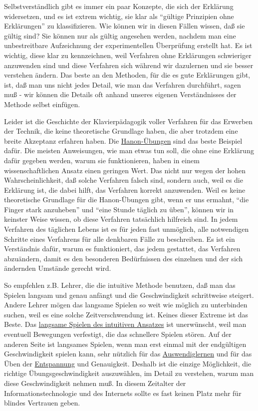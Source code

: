 Selbstverständlich gibt es immer ein paar Konzepte, die sich der Erklärung widersetzen, und es ist extrem wichtig, sie klar als \enquote{gültige Prinzipien ohne Erklärungen} zu klassifizieren.
 Wie können wir in diesen Fällen wissen, daß sie gültig sind?
 Sie können nur als gültig angesehen werden, nachdem man eine unbestreitbare Aufzeichnung der experimentellen Überprüfung erstellt hat.
 Es ist wichtig, diese klar zu kennzeichnen, weil Verfahren ohne Erklärungen schwieriger anzuwenden sind und diese Verfahren sich während wir dazulernen und sie besser verstehen ändern.
 Das beste an den Methoden, für die es gute Erklärungen gibt, ist, daß man uns nicht jedes Detail, wie man das Verfahren durchführt, sagen muß - wir können die Details oft anhand unseres eigenen Verständnisses der Methode selbst einfügen.
 

Leider ist die Geschichte der Klavierpädagogik voller Verfahren für das Erwerben der Technik, die keine theoretische Grundlage haben, die aber trotzdem eine breite Akzeptanz erfahren haben.
 Die \hyperlink{c1iii7h}{Hanon-Übungen} sind das beste Beispiel dafür.
 Die meisten Anweisungen, wie man etwas tun soll, die ohne eine Erklärung dafür gegeben werden, warum sie funktionieren, haben in einem wissenschaftlichen Ansatz einen geringen Wert.
 Das nicht nur wegen der hohen Wahrscheinlichkeit, daß solche Verfahren falsch sind, sondern auch, weil es die Erklärung ist, die dabei hilft, das Verfahren korrekt anzuwenden.
 Weil es keine theoretische Grundlage für die Hanon-Übungen gibt, wenn er uns ermahnt, \enquote{die Finger stark anzuheben} und \enquote{eine Stunde täglich zu üben}, können wir in keinster Weise wissen, ob diese Verfahren tatsächlich hilfreich sind.
 In jedem Verfahren des täglichen Lebens ist es für jeden fast unmöglich, alle notwendigen Schritte eines Verfahrens für alle denkbaren Fälle zu beschreiben.
 Es ist ein Verständnis dafür, warum es funktioniert, das jedem gestattet, das Verfahren abzuändern, damit es den besonderen Bedürfnissen des einzelnen und der sich ändernden Umstände gerecht wird.
 

So empfehlen z.B. Lehrer, die die intuitive Methode benutzen, daß man das Spielen langsam und genau anfängt und die Geschwindigkeit schrittweise steigert.
 Andere Lehrer mögen das langsame Spielen so weit wie möglich zu unterbinden suchen, weil es eine solche Zeitverschwendung ist.
 Keines dieser Extreme ist das Beste.
 Das \hyperlink{c1ii16}{langsame Spielen des intuitiven Ansatzes} ist unerwünscht, weil man eventuell Bewegungen verfestigt, die das schnellere Spielen stören.
 Auf der anderen Seite ist langsames Spielen, wenn man erst einmal mit der endgültigen Geschwindigkeit spielen kann, sehr nützlich für das \hyperlink{c1iii6h}{Auswendiglernen} und für das Üben der \hyperlink{c1ii14}{Entspannung} und Genauigkeit.
 Deshalb ist die einzige Möglichkeit, die richtige Übungsgeschwindigkeit auszuwählen, im Detail zu verstehen, warum man diese Geschwindigkeit nehmen muß.
 In diesem Zeitalter der Informationstechnologie und des Internets sollte es fast keinen Platz mehr für blindes Vertrauen geben.
 

